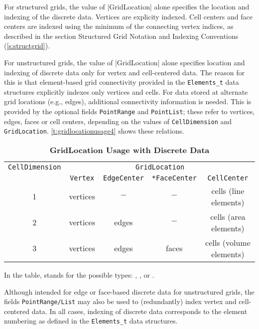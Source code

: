For structured grids, the value of |GridLocation| alone specifies the location
and indexing of the discrete data.  Vertices are explicity indexed.  Cell
centers and face centers are indexed using the minimum of the connecting vertex
indices, as described in the section Structured Grid Notation and Indexing
Conventions (\autoref{s:structgrid}).

For unstructured grids, the value of |GridLocation| alone specifies location and
indexing of discrete data only for vertex and cell-centered data.  The
reason for this is that element-based grid connectivity provided in the
\texttt{Elements\_t} data structures explicitly indexes only vertices and cells.
For data stored at alternate grid locations (e.g., edges), additional
connectivity information is needed.  This is provided by the optional fields
\texttt{PointRange} and \texttt{PointList}; these refer to
vertices, edges, faces or cell centers, depending on the values of
\texttt{CellDimension} and \texttt{GridLocation}.  \autoref{t:gridlocationusage4} shows
these relations.

\begin{table}[htbp]
\centering
\caption[GridLocation Usage with Discrete Data]{\textbf{GridLocation Usage with Discrete Data}}
\label{t:gridlocationusage4}
\begin{tabular}{||c|c|c|c|c||}
 \hline
\texttt{CellDimension} & \multicolumn{4}{c||}{\texttt{GridLocation}} \\
& \texttt{Vertex} & \texttt{EdgeCenter} & \texttt{*FaceCenter} & \texttt{CellCenter} \\
 \hline
1 & vertices & $-$ & $-$ & cells (line elements) \\
2 & vertices & edges & $-$ & cells (area elements) \\
3 & vertices & edges & faces & cells (volume elements) \\
 \hline
\end{tabular}
\end{table}

In the table,  stands for the possible types: ,
,  or .

Although intended for edge or face-based discrete data for unstructured grids,
the fields \texttt{PointRange/List} may also be used to (redundantly) index
vertex and cell-centered data.  In all cases, indexing of discrete data
corresponds to the element numbering as defined in the \texttt{Elements\_t} data
structures.

